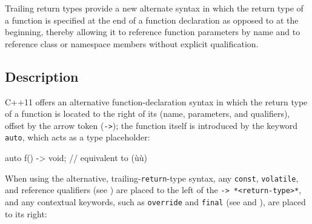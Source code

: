
\setcounter{table}{0}
\setcounter{footnote}{0}
\setcounter{lstlisting}{0}

Trailing return types provide a new alternate syntax in which the return type of a function is specified at
the end of a function declaration as opposed to at the beginning,
thereby allowing it to reference function parameters by name and to reference class
or namespace members without explicit qualification.

\subsection[Description]{Description}\label{description}

C++11 offers an alternative function-declaration syntax in which the
return type of a function is located to the right of its
 (name, parameters, and qualifiers), offset by the
arrow token (\lstinline!->!); the function itself is introduced by the
keyword \lstinline!auto!, which acts as a type placeholder:
%

\begin{emcppslisting}
auto f() -> void;  // equivalent to (ù{}ù)
\end{emcppslisting}

When using the alternative, trailing-\lstinline!return!-type syntax, any \lstinline!const!,
\lstinline!volatile!, and reference qualifiers (see
) are placed to the left of
the \lstinline!->!~\lstinline!*<return-type>*!, and any contextual keywords, such as
\lstinline!override! and \lstinline!final! (see
and
), are placed to its right:

